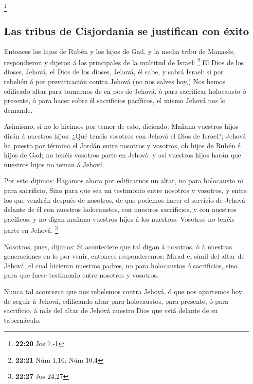 \footnote{\textbf{22:20} Jos 7,-1}

\hypertarget{las-tribus-de-cisjordania-se-justifican-con-uxe9xito}{%
\subsection{Las tribus de Cisjordania se justifican con
éxito}\label{las-tribus-de-cisjordania-se-justifican-con-uxe9xito}}

 Entonces los hijos de Rubén y los hijos de Gad, y la
media tribu de Manasés, respondieron y dijeron á los principales de la
multitud de Israel: \footnote{\textbf{22:21} Núm 1,16; Núm 10,4}
 El Dios de los dioses, Jehová, el Dios de los dioses,
Jehová, él sabe, y sabrá Israel: si por rebelión ó por prevaricación
contra Jehová (no nos salves hoy,)  Nos hemos edificado
altar para tornarnos de en pos de Jehová, ó para sacrificar holocausto ó
presente, ó para hacer sobre él sacrificios pacíficos, el mismo Jehová
nos lo demande.

 Asimismo, si no lo hicimos por temor de esto, diciendo:
Mañana vuestros hijos dirán á nuestros hijos: ¿Qué tenéis vosotros con
Jehová el Dios de Israel?;  Jehová ha puesto por término
el Jordán entre nosotros y vosotros, oh hijos de Rubén é hijos de Gad;
no tenéis vosotros parte en Jehová: y así vuestros hijos harán que
nuestros hijos no teman á Jehová.

 Por esto dijimos: Hagamos ahora por edificarnos un
altar, no para holocausto ni para sacrificio,  Sino para
que sea un testimonio entre nosotros y vosotros, y entre los que vendrán
después de nosotros, de que podemos hacer el servicio de Jehová delante
de él con nuestros holocaustos, con nuestros sacrificios, y con nuestros
pacíficos; y no digan mañana vuestros hijos á los nuestros: Vosotros no
tenéis parte en Jehová. \footnote{\textbf{22:27} Jos 24,27}

 Nosotros, pues, dijimos: Si aconteciere que tal digan á
nosotros, ó á nuestras generaciones en lo por venir, entonces
responderemos: Mirad el símil del altar de Jehová, el cual hicieron
nuestros padres, no para holocaustos ó sacrificios, sino para que fuese
testimonio entre nosotros y vosotros.

 Nunca tal acontezca que nos rebelemos contra Jehová, ó
que nos apartemos hoy de seguir á Jehová, edificando altar para
holocaustos, para presente, ó para sacrificio, á más del altar de Jehová
nuestro Dios que está delante de su tabernáculo.

